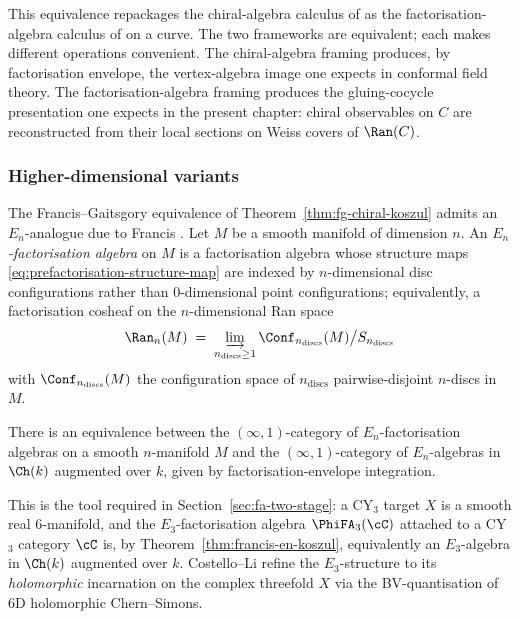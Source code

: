 This equivalence repackages the chiral-algebra calculus of
\cite{BeilinsonDrinfeld} as the factorisation-algebra calculus of
\cite{CostelloGwilliam,CostelloGwilliam2017} on a curve. The two
frameworks are equivalent; each makes different operations convenient.
The chiral-algebra framing produces, by factorisation envelope, the
vertex-algebra image one expects in conformal field theory. The
factorisation-algebra framing produces the gluing-cocycle presentation
one expects in the present chapter: chiral observables on $C$ are
reconstructed from their local sections on Weiss covers of $\Ran(C)$.

\subsubsection{Higher-dimensional variants}
\label{subsec:higher-en-fa}

The Francis--Gaitsgory equivalence of Theorem~\ref{thm:fg-chiral-koszul}
admits an $E_n$-analogue due to Francis \cite{Francis2013}. Let $M$
be a smooth manifold of dimension $n$. An \emph{$E_n$-factorisation
algebra} on $M$ is a factorisation algebra whose structure maps
\eqref{eq:prefactorisation-structure-map} are indexed by
$n$-dimensional disc configurations rather than $0$-dimensional point
configurations; equivalently, a factorisation cosheaf on the
$n$-dimensional Ran space
\begin{equation}
\label{eq:higher-ran-space}
 \Ran_n(M) \;=\; \varinjlim_{n_{\mathrm{discs}} \ge 1}
 \Conf_{n_{\mathrm{discs}}}(M) \big/ S_{n_{\mathrm{discs}}}
\end{equation}
with $\Conf_{n_{\mathrm{discs}}}(M)$ the configuration space of
$n_{\mathrm{discs}}$ pairwise-disjoint $n$-discs in $M$.

\begin{theorem}
\label{thm:francis-en-koszul}
\ClaimStatusProvedElsewhere
There is an equivalence between the $(\infty, 1)$-category of
$E_n$-factorisation algebras on a smooth $n$-manifold $M$ and the
$(\infty, 1)$-category of $E_n$-algebras in $\Ch(k)$ augmented over
$k$, given by factorisation-envelope integration.
\end{theorem}

This is the tool required in Section~\ref{sec:fa-two-stage}: a CY$_3$
target $X$ is a smooth real $6$-manifold, and the $E_3$-factorisation
algebra $\PhiFA_3(\cC)$ attached to a CY$_3$ category $\cC$ is,
by Theorem~\ref{thm:francis-en-koszul}, equivalently an $E_3$-algebra
in $\Ch(k)$ augmented over $k$. Costello--Li
\cite{CostelloLi2016,CostelloLi2020} refine the $E_3$-structure to its
\emph{holomorphic} incarnation on the complex threefold $X$ via the
BV-quantisation of 6D holomorphic Chern--Simons.

